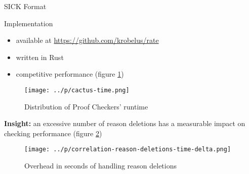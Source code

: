 \documentclass[final,hyperref={pdfpagelabels=true}]{beamer}
\begin{document}
\begin{frame}[fragile]
\begin{columns}[t]
\begin{column}{.45\textwidth}
\begin{block}{SICK Format}
    \end{block}
    \begin{block}{Implementation}
        \begin{itemize}
            \item available at \url{https://github.com/krobelus/rate}
            \item written in Rust
            \item competitive performance (figure \ref{fig:cactus-time})
        \end{itemize}
    \end{block}

    \begin{figure}
        \centering
        \caption{Distribution of Proof Checkers' runtime\label{fig:cactus-time}}
        \texttt{[image: ../p/cactus-time.png]}
    \end{figure}

    \textbf{Insight:} an excessive number of reason deletions
    has a measurable impact on checking performance (figure
    \ref{fig:correlation-reason-deletions-time-delta})

    \begin{figure}
        \centering
        \caption{Overhead in seconds of handling reason deletions\label{fig:correlation-reason-deletions-time-delta}}
        \texttt{[image: ../p/correlation-reason-deletions-time-delta.png]}
    \end{figure}

    \end{column}
  \end{columns}
\end{frame}
\end{document}

